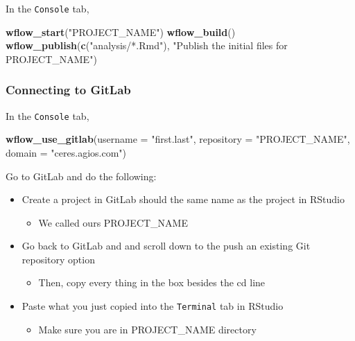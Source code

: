 \documentclass[]{book}
\newenvironment{Shaded}{\begin{snugshade}}{\end{snugshade}}
\newcommand{\DataTypeTok}[1]{\textcolor[rgb]{0.13,0.29,0.53}{#1}}
\newcommand{\KeywordTok}[1]{\textcolor[rgb]{0.13,0.29,0.53}{\textbf{#1}}}
\newcommand{\NormalTok}[1]{#1}
\newcommand{\StringTok}[1]{\textcolor[rgb]{0.31,0.60,0.02}{#1}}
\providecommand{\tightlist}{%
  \setlength{\itemsep}{0pt}\setlength{\parskip}{0pt}}
\begin{document}
In the \texttt{Console} tab,

\begin{Shaded}
\begin{Highlighting}[]
\KeywordTok{wflow_start}\NormalTok{(}\StringTok{"PROJECT_NAME"}\NormalTok{)}
\KeywordTok{wflow_build}\NormalTok{()}
\KeywordTok{wflow_publish}\NormalTok{(}\KeywordTok{c}\NormalTok{(}\StringTok{"analysis/*.Rmd"}\NormalTok{), }\StringTok{"Publish the initial files for PROJECT_NAME"}\NormalTok{)}
\end{Highlighting}
\end{Shaded}

\hypertarget{connecting-to-gitlab}{%
\subsubsection{Connecting to GitLab}\label{connecting-to-gitlab}}

In the \texttt{Console} tab,

\begin{Shaded}
\begin{Highlighting}[]
\KeywordTok{wflow_use_gitlab}\NormalTok{(}\DataTypeTok{username =} \StringTok{"first.last"}\NormalTok{, }\DataTypeTok{repository =} \StringTok{"PROJECT_NAME"}\NormalTok{, }\DataTypeTok{domain =} \StringTok{"ceres.agios.com"}\NormalTok{)}
\end{Highlighting}
\end{Shaded}

Go to GitLab and do the following:

\begin{itemize}
\tightlist
\item
  Create a project in GitLab should the same name as the project in RStudio

  \begin{itemize}
  \tightlist
  \item
    We called ours PROJECT\_NAME
  \end{itemize}
\item
  Go back to GitLab and and scroll down to the push an existing Git repository option

  \begin{itemize}
  \tightlist
  \item
    Then, copy every thing in the box besides the cd line
  \end{itemize}
\item
  Paste what you just copied into the \texttt{Terminal} tab in RStudio

  \begin{itemize}
  \tightlist
  \item
    Make sure you are in PROJECT\_NAME directory
  \end{itemize}
\end{itemize}
\end{document}
